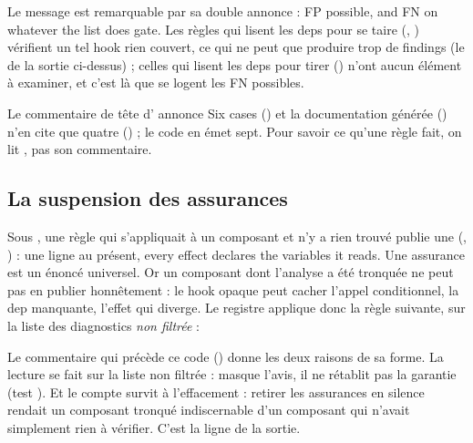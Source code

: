 
Le message est remarquable par sa double annonce : \og FP possible, and FN on whatever the list does gate\fg{}. Les règles qui lisent les deps pour se taire (, ) vérifient un tel hook \og rien couvert\fg{}, ce qui ne peut que produire trop de findings (le  de la sortie ci-dessus) ; celles qui lisent les deps pour tirer () n'ont aucun élément à examiner, et c'est là que se logent les FN possibles.

\begin{piege}
Le commentaire de tête d' annonce \og Six cases\fg{} () et la documentation générée () n'en cite que quatre () ; le code en émet sept. Pour savoir ce qu'une règle fait, on lit , pas son commentaire.
\end{piege}

\subsection{La suspension des assurances}
\label{sec:regles-effets-suspension}

Sous , une règle qui s'appliquait à un composant et n'y a rien trouvé publie une  (, ) : une ligne  au présent, \og every effect declares the variables it reads\fg{}. Une assurance est un énoncé universel. Or un composant dont l'analyse a été tronquée ne peut pas en publier honnêtement : le hook opaque peut cacher l'appel conditionnel, la dep manquante, l'effet qui diverge. Le registre applique donc la règle suivante, sur la liste des diagnostics \emph{non filtrée} :


Le commentaire qui précède ce code () donne les deux raisons de sa forme. La lecture se fait sur la liste non filtrée :  masque l'avis, il ne rétablit pas la garantie (test ). Et le compte survit à l'effacement : retirer les assurances en silence rendait un composant tronqué indiscernable d'un composant qui n'avait simplement rien à vérifier. C'est la ligne  de la sortie.


